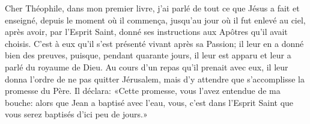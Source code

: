 Cher Théophile, dans mon premier livre,
	j’ai parlé de tout ce que Jésus a fait et enseigné,
	depuis le moment où il commença,
	jusqu’au jour où il fut enlevé au ciel, après avoir, par l’Esprit Saint,
	donné ses instructions aux Apôtres qu’il avait choisis.
C’est à eux qu’il s’est présenté vivant après sa Passion;
	il leur en a donné bien des preuves, puisque, pendant quarante jours,
	il leur est apparu et leur a parlé du royaume de Dieu.
Au cours d’un repas qu’il prenait avec eux,
	il leur donna l’ordre de ne pas quitter Jérusalem,
	mais d’y attendre que s’accomplisse la promesse du Père.
Il déclara: «Cette promesse, vous l’avez entendue de ma bouche:
	alors que Jean a baptisé avec l’eau,
	vous, c’est dans l’Esprit Saint que vous serez baptisés d’ici peu de jours.»
